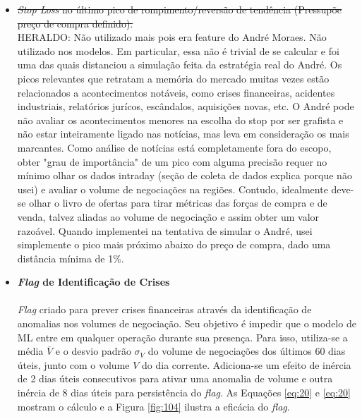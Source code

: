 \begin{itemize}
    \item \sout{\textit{Stop Loss} no último pico de rompimento/reversão de tendência (Pressupõe preço de compra definido).} \\
    \color{red} HERALDO: Não utilizado mais pois era feature do André Moraes. Não utilizado nos modelos. Em particular, essa não é trivial de se calcular e foi uma das quais distanciou a simulação feita da estratégia real do André. Os picos relevantes que retratam a memória do mercado muitas vezes estão relacionados a acontecimentos notáveis, como crises financeiras, acidentes industriais, relatórios jurícos, escândalos, aquisições novas, etc. O André pode não avaliar os acontecimentos menores na escolha do stop por ser grafista e não estar inteiramente ligado nas notícias, mas leva em consideração os mais marcantes. Como análise de notícias está completamente fora do escopo, obter "grau de importância" de um pico com alguma precisão requer no mínimo olhar os dados intraday (seção de coleta de dados explica porque não usei) e avaliar o volume de negociações na regiões. Contudo, idealmente deve-se olhar o livro de ofertas para tirar métricas das forças de compra e de venda, talvez aliadas ao volume de negociação e assim obter um valor razoável. Quando implementei na tentativa de simular o André, usei simplemente o pico mais próximo abaixo do preço de compra, dado uma distância mínima de 1\%. 

    \item \textbf{\textit{Flag} de Identificação de Crises} \\ \\
        \textit{Flag} criado para prever crises financeiras através da identificação de anomalias nos volumes de negociação. Seu objetivo é impedir que o modelo de ML entre em qualquer operação durante sua presença. Para isso, utiliza-se a média \begin{math} \overline{V} \end{math} e o desvio padrão \begin{math} \sigma_V \end{math} do volume de negociações dos últimos 60 dias úteis, junto com o volume \begin{math} V \end{math} do dia corrente. Adiciona-se um efeito de inércia de 2 dias úteis consecutivos para ativar uma anomalia de volume e outra inércia de 8 dias úteis para persistência do \textit{flag}. As Equações \ref{eq:20} e \ref{eq:20} mostram o cálculo e a Figura \ref{fig:104} ilustra a eficácia do \textit{flag}.


\end{itemize}

